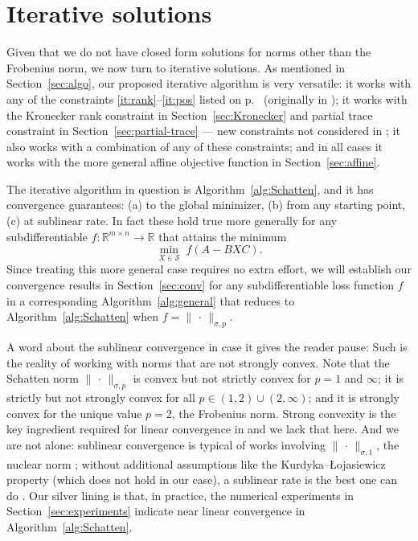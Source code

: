 \documentclass[11pt,reqno]{amsart}
\newcommand{\st}{\sigma}
\theoremstyle{definition}
\numberwithin{equation}{section}
\newcommand{\R}{\mathbb{R}}
\begin{document}
\section{Iterative solutions}\label{sec:iterative}

Given that we do not have closed form solutions for norms other than the Frobenius norm, we now turn to iterative solutions. As mentioned in Section~\ref{sec:algo}, our proposed iterative algorithm is very versatile: it works with any of the constraints \ref{it:rank}--\ref{it:pos} listed on p.~\pageref{it:pos} (originally in \cite{li22}); it works with the Kronecker rank constraint in Section~\ref{sec:Kronecker} and partial trace constraint in Section~\ref{sec:partial-trace} --- new constraints not considered in \cite{li22}; it also works with a combination of any of these constraints; and in all cases it works with the more general affine objective function in Section~\ref{sec:affine}.

The iterative algorithm in question is Algorithm~\ref{alg:Schatten}, and it has convergence guarantees: (a) to the global minimizer, (b) from any starting point, (c) at sublinear rate. In fact these hold true more generally for any subdifferentiable $f: \R^{m \times n} \to \R$ that attains the minimum 
\begin{equation}\label{eq:coercive}
    \min_{X \in \mathcal{S}} \; f(A - BXC).
\end{equation}
Since treating this more general case requires no extra effort, we will establish our convergence results in Section~\ref{sec:conv} for any subdifferentiable loss function $f$ in a corresponding Algorithm~\ref{alg:general} that reduces to Algorithm~\ref{alg:Schatten} when $f = \lVert\,\cdot\,\rVert_{\st, p}$.

A word about the sublinear convergence in case it gives the reader pause: Such is the reality of working with norms that are not strongly convex. Note that the Schatten norm $\lVert\,\cdot\,\rVert_{\st, p}$ is convex but not strictly convex for $p =1$ and $\infty$; it is strictly but not strongly convex for all $p \in (1,2)\cup (2,\infty)$; and it is strongly convex for the unique value $p = 2$, the Frobenius norm. Strong convexity is the key ingredient required for linear convergence in \cite[Theorem~4.4]{li22} and we lack that here. And we are not alone: sublinear convergence is typical of works involving $\lVert\,\cdot\,\rVert_{\st, 1}$, the nuclear norm \cite{sublinear2, sublinear1}; without additional assumptions like the Kurdyka--\L ojasiewicz property (which does not hold in our case), a sublinear rate is the best one can do \cite{strongconvex}. Our silver lining is that, in practice, the numerical experiments in Section~\ref{sec:experiments} indicate near linear convergence in Algorithm~\ref{alg:Schatten}.
\end{document}

